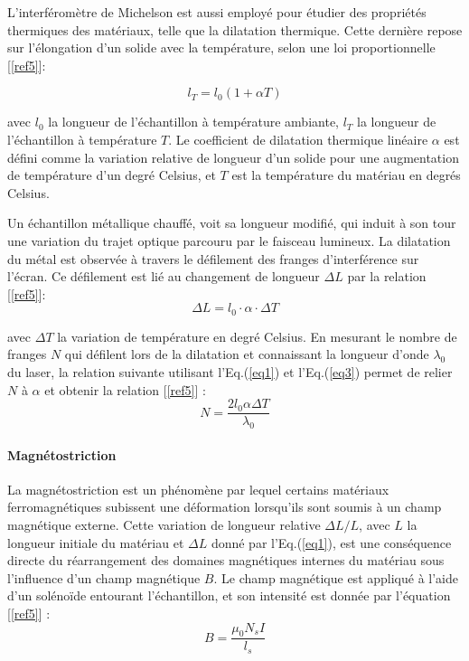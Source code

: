 \documentclass[a4paper, 12pt,oneside]{article}
\begin{document}
L’interféromètre de Michelson est aussi employé pour étudier des propriétés thermiques des matériaux, telle que la dilatation thermique. Cette dernière repose sur l'élongation d'un solide avec la température, selon une loi proportionnelle [\ref{ref5}]: 

\begin{equation}
   l_T = l_0(1+\alpha T) 
\label{eq2}
\end{equation}

\noindent avec $l_0$ la longueur de l’échantillon à température ambiante, $l_T$ la longueur de l’échantillon à température $T$. Le coefficient de dilatation thermique linéaire $\alpha$ est défini comme la variation relative de longueur d’un solide pour une augmentation de température d’un degré Celsius, et $T$ est la température du matériau en degrés Celsius.

Un échantillon métallique chauffé, voit sa longueur modifié, qui induit à son tour une variation du trajet optique parcouru par le faisceau lumineux. La dilatation du métal est observée à travers le défilement des franges d’interférence sur l’écran. Ce défilement est lié au changement de longueur $\Delta L$ par la relation [\ref{ref5}]:
\begin{equation}
    \Delta L = l_0 \cdot \alpha \cdot \Delta T
\label{eq3}
\end{equation}

\noindent avec $\Delta T$ la variation de température en degré Celsius. En mesurant le nombre de franges $N$ qui défilent lors de la dilatation et connaissant la longueur d’onde $\lambda_0$ du laser, la relation suivante utilisant l'Eq.(\ref{eq1}) et l'Eq.(\ref{eq3}) permet de relier $N$ à $\alpha$ et obtenir la relation [\ref{ref5}] :
\begin{equation}
    N = \frac{2 l_0 \alpha \Delta T}{\lambda_0}
\label{eq4}
\end{equation}

\paragraph{Magnétostriction}

La magnétostriction est un phénomène par lequel certains matériaux ferromagnétiques subissent une déformation lorsqu'ils sont soumis à un champ magnétique externe. Cette variation de longueur relative $\Delta L/ L$, avec $L$ la longueur initiale du matériau et $\Delta L$ donné par l’Eq.(\ref{eq1}), est une conséquence directe du réarrangement des domaines magnétiques internes du matériau sous l'influence d'un champ magnétique $B$. Le champ magnétique est appliqué à l’aide d’un solénoïde entourant l’échantillon, et son intensité est donnée par l’équation [\ref{ref5}] :
\begin{equation}
    B = \frac{\mu_0 N_s I}{l_s}
\label{eq5}
\end{equation}
\end{document}
